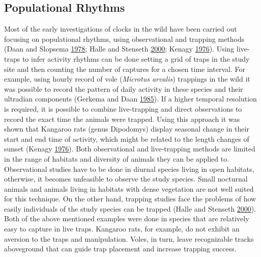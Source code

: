 \documentclass[msc,numbers,hidelinks]{coppe}
\begin{document}
  \hypertarget{populational-rhythms}{%
  \subsection{Populational Rhythms}\label{populational-rhythms}}

  Most of the early investigations of clocks in the wild have been carried out focusing on populational rhythms, using observational and trapping methods (Daan and Slopsema \protect\hyperlink{ref-daanShorttermRhythmsForaging1978}{1978}; Halle and Stenseth \protect\hyperlink{ref-halleActivityPatternsSmall2000}{2000}; Kenagy \protect\hyperlink{ref-kenagyPeriodicityDailyActivity1976}{1976}). Using live-traps to infer activity rhythms can be done setting a grid of traps in the study site and then counting the number of captures for a chosen time interval. For example, using hourly record of vole (\emph{Microtus arvalis}) trappings in the wild it was possible to record the pattern of daily activity in these species and their ultradian components (Gerkema and Daan \protect\hyperlink{ref-gerkemaUltradianRhythmsBehavior1985}{1985}). If a higher temporal resolution is required, it is possible to combine live-trapping and direct observations to record the exact time the animals were trapped. Using this approach it was shown that Kangaroo rats (genus Dipodomys) display seasonal change in their start and end time of activity, which might be related to the length changes of sunset (Kenagy \protect\hyperlink{ref-kenagyPeriodicityDailyActivity1976}{1976}). Both observational and live-trapping methods are limited in the range of habitats and diversity of animals they can be applied to. Observational studies have to be done in diurnal species living in open habitats, otherwise, it becomes unfeasible to observe the study species. Small nocturnal animals and animals living in habitats with dense vegetation are not well suited for this technique. On the other hand, trapping studies face the problems of how easily individuals of the study species can be trapped (Halle and Stenseth \protect\hyperlink{ref-halleActivityPatternsSmall2000}{2000}). Both of the above mentioned examples were done in species that are relatively easy to capture in live traps. Kangaroo rats, for example, do not exhibit an aversion to the traps and manipulation. Voles, in turn, leave recognizable tracks aboveground that can guide trap placement and increase trapping success.
\end{document}
